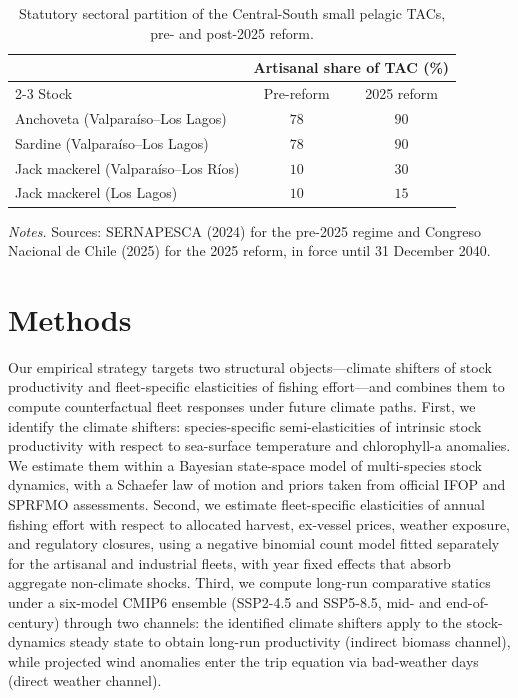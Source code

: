\documentclass[
  11pt,
]{article}
\begin{document}
\begin{table}[H]
\centering
\caption{Statutory sectoral partition of the Central-South small pelagic TACs, pre- and post-2025 reform.\label{tab:fractioning}}
\begin{threeparttable}
\begin{tabular}{lcc}
\toprule
 & \multicolumn{2}{c}{Artisanal share of TAC (\%)} \\
\cmidrule(lr){2-3}
Stock & Pre-reform & 2025 reform \\
\midrule
Anchoveta (Valparaíso--Los Lagos)             & $78$ & $90$ \\
Sardine (Valparaíso--Los Lagos)       & $78$ & $90$ \\
Jack mackerel (Valparaíso--Los Ríos)                  & $10$ & $30$ \\
Jack mackerel (Los Lagos)                             & $10$ & $15$ \\
\bottomrule
\end{tabular}
\begin{tablenotes}
\footnotesize
\item \emph{Notes.} Sources: SERNAPESCA (2024) for the pre-2025 regime and Congreso Nacional de Chile (2025) for the 2025 reform, in force until 31 December 2040.
\end{tablenotes}
\end{threeparttable}
\end{table}

\section{Methods}\label{methods}

Our empirical strategy targets two structural objects---climate shifters of stock productivity and fleet-specific elasticities of fishing effort---and combines them to compute counterfactual fleet responses under future climate paths. First, we identify the climate shifters: species-specific semi-elasticities of intrinsic stock productivity with respect to sea-surface temperature and chlorophyll-a anomalies. We estimate them within a Bayesian state-space model of multi-species stock dynamics, with a Schaefer law of motion and priors taken from official IFOP and SPRFMO assessments. Second, we estimate fleet-specific elasticities of annual fishing effort with respect to allocated harvest, ex-vessel prices, weather exposure, and regulatory closures, using a negative binomial count model fitted separately for the artisanal and industrial fleets, with year fixed effects that absorb aggregate non-climate shocks. Third, we compute long-run comparative statics under a six-model CMIP6 ensemble (SSP2-4.5 and SSP5-8.5, mid- and end-of-century) through two channels: the identified climate shifters apply to the stock-dynamics steady state to obtain long-run productivity (indirect biomass channel), while projected wind anomalies enter the trip equation via bad-weather days (direct weather channel).
\end{document}
